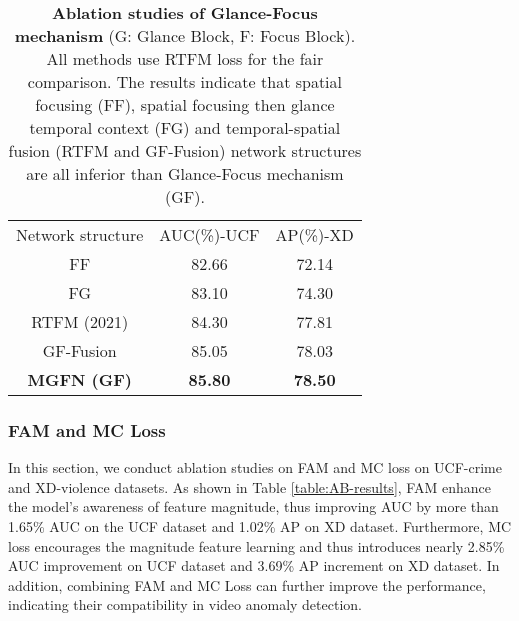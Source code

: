 \documentclass[letterpaper]{article} \usepackage{aaai23}  \usepackage{times}  \usepackage{helvet}  \usepackage{courier}  \usepackage[hyphens]{url}  \usepackage{graphicx} \urlstyle{rm} \def\UrlFont{\rm}  \usepackage{natbib}  \usepackage{caption} \frenchspacing  \setlength{\pdfpagewidth}{8.5in}  \setlength{\pdfpageheight}{11in}  \usepackage{algorithm}
\begin{document}
\setlength{\tabcolsep}{4pt}
\begin{table}[!t]
\begin{center}
\begin{tabular}{ccc}
\hline\noalign{\smallskip}
Network structure & AUC(\%)-UCF & AP(\%)-XD \\ 
\noalign{\smallskip}
\hline
\noalign{\smallskip}
FF & 82.66 & 72.14\\
FG & 83.10 & 74.30\\
RTFM (2021) & 84.30 & 77.81\\
GF-Fusion & 85.05 & 78.03\\
\textbf{MGFN (GF)} & \textbf{85.80} & \textbf{78.50}\\
\hline
\end{tabular}
\caption{\textbf{Ablation studies of Glance-Focus mechanism} (G: Glance Block, F: Focus Block). All methods use RTFM loss \cite{RTFM} for the fair comparison. The results indicate that spatial focusing (FF), spatial focusing then glance temporal context (FG) and temporal-spatial fusion (RTFM \cite{RTFM} and GF-Fusion) network structures are all inferior than Glance-Focus mechanism (GF).}
\label{table:backbone-design}
\vspace{-3mm}
\end{center}
\end{table}
\setlength{\tabcolsep}{1.4pt}


\subsubsection{FAM and MC Loss}
In this section, we conduct ablation studies on FAM and MC loss on UCF-crime and XD-violence datasets. As shown in Table \ref{table:AB-results}, FAM enhance the model's awareness of feature magnitude, thus improving AUC by more than 1.65\% AUC on the UCF dataset and 1.02\% AP on XD dataset. Furthermore, MC loss encourages the magnitude feature learning and thus introduces nearly 2.85\% AUC improvement on UCF dataset and 3.69\% AP increment on XD dataset. In addition, combining FAM and MC Loss can further improve the performance, indicating their compatibility in video anomaly detection. 
\end{document}
